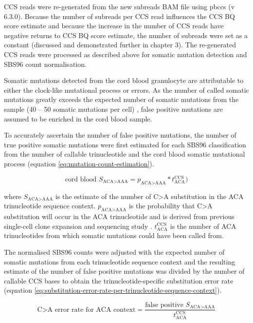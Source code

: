 CCS reads were re-generated from the new subreads BAM file using pbccs (v 6.3.0). Because the number of subreads per CCS read influences the CCS BQ score estimate and because the increase in the number of CCS reads have negative returns to CCS BQ score estimate, the number of subreads were set as a constant (discussed and demonstrated further in chapter 3). The re-generated CCS reads were processed as described above for somatic mutation detection and SBS96 count normalisation. 

Somatic mutations detected from the cord blood granulocyte are attributable to either the clock-like mutational process or errors. As the number of called somatic mutations greatly exceeds the expected number of somatic mutations from the sample (40 – 50 somatic mutations per cell) \cite{Mitchell2022-ry, Osorio2018-mh}, false positive mutations are assumed to be enriched in the cord blood sample.
 
To accurately ascertain the number of false positive mutations, the number of true positive somatic mutations were first estimated for each SBS96 classification from the number of callable trinucleotide and the cord blood somatic mutational process (equation \ref{eq:mutation-count-estimation}). 

\begin{equation} \label{eq:mutation-count-estimation}
\text{cord blood } S_{\text{ACA>AAA}}= p_{\text{ACA>AAA}} * t^{\text{CCS}}_{\text{ACA}})
\end{equation}

where $S_{\text{ACA>AAA}}$ is the estimate of the number of C>A substitution in the ACA trinucleotide sequence context. $p_{\text{ACA>AAA}}$ is the probability that C>A substitution will occur in the ACA trinucleotide and is derived from previous single-cell clone expansion and sequencing study \cite{Mitchell2022-ry}. $t^{\text{CCS}}_{\text{ACA}}$ is the number of ACA trinucleotides from which somatic mutations could have been called from.

The normalised SBS96 counts were adjusted with the expected number of somatic mutations from each trinucleotide sequence context and the resulting estimate of the number of false positive mutations was divided by the number of callable CCS bases to obtain the trinucleotide-specific substitution error rate (equation \ref{eq:substitution-error-rate-per-trinucleotide-sequence-context}). 

\begin{equation} \label{eq:substitution-error-rate-per-trinucleotide-sequence-context}
\text{C>A error rate for ACA context} = \frac{\text{false positive } S_{\text{ACA>AAA}}}{t^{\text{CCS}}_{\text{ACA}}}
\end{equation}

